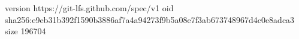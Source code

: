 version https://git-lfs.github.com/spec/v1
oid sha256:e9eb31b392f1590b3886af7a4a94273f9b5a08e7f3ab673748967d4c0e8adca3
size 196704
